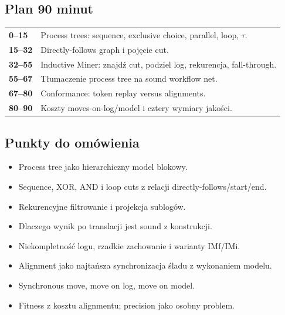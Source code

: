 \documentclass[11pt,a4paper]{article}
\begin{document}
\subsection{Plan 90 minut}
\begin{center}\small\begin{tabularx}{0.96\textwidth}{@{}>{\bfseries}p{18mm}X@{}}
0--15 & Process trees: sequence, exclusive choice, parallel, loop, $\tau$.\\
15--32 & Directly-follows graph i pojęcie cut.\\
32--55 & Inductive Miner: znajdź cut, podziel log, rekurencja, fall-through.\\
55--67 & Tłumaczenie process tree na sound workflow net.\\
67--80 & Conformance: token replay versus alignments.\\
80--90 & Koszty moves-on-log/model i cztery wymiary jakości.\\
\end{tabularx}\end{center}

\subsection{Punkty do omówienia}
\begin{itemize}
\item Process tree jako hierarchiczny model blokowy.
\item Sequence, XOR, AND i loop cuts z relacji directly-follows/start/end.
\item Rekurencyjne filtrowanie i projekcja sublogów.
\item Dlaczego wynik po translacji jest sound z konstrukcji.
\item Niekompletność logu, rzadkie zachowanie i warianty IMf/IMi.
\item Alignment jako najtańsza synchronizacja śladu z wykonaniem modelu.
\item Synchronous move, move on log, move on model.
\item Fitness z kosztu alignmentu; precision jako osobny problem.
\end{itemize}
\end{document}
